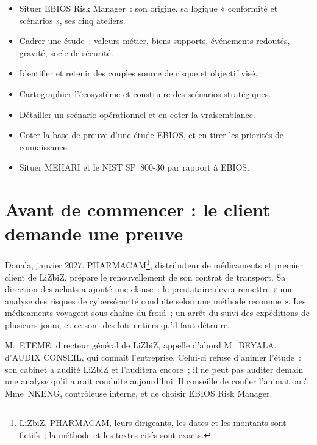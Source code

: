 \begin{boxobjectifs}
\begin{itemize}
    \item Situer EBIOS Risk Manager~: son origine, sa logique « conformité
          et scénarios », ses cinq ateliers.
    \item Cadrer une étude~: valeurs métier, biens supports, événements
          redoutés, gravité, socle de sécurité.
    \item Identifier et retenir des couples source de risque et objectif
          visé.
    \item Cartographier l'écosystème et construire des scénarios
          stratégiques.
    \item Détailler un scénario opérationnel et en coter la vraisemblance.
    \item Coter la base de preuve d'une étude EBIOS, et en tirer les
          priorités de connaissance.
    \item Situer MEHARI et le NIST SP~800-30 par rapport à EBIOS.
\end{itemize}
\end{boxobjectifs}

\bigskip

\section*{Avant de commencer : le client demande une preuve}

Douala, janvier 2027. PHARMACAM\footnote{LiZbiZ, PHARMACAM, leurs
dirigeants, les dates et les montants sont fictifs~; la méthode et les
textes cités sont exacts.}, distributeur de médicaments et premier client
de LiZbiZ, prépare le renouvellement de son contrat de transport. Sa
direction des achats a ajouté une clause~: le prestataire devra remettre
« une analyse des risques de cybersécurité conduite selon une méthode
reconnue ». Les médicaments voyagent sous chaîne du froid~; un arrêt du
suivi des expéditions de plusieurs jours, et ce sont des lots entiers
qu'il faut détruire.

M.~ETEME, directeur général de LiZbiZ, appelle d'abord M.~BEYALA, d'AUDIX
CONSEIL, qui connaît l'entreprise. Celui-ci refuse d'animer l'étude~: son
cabinet a audité LiZbiZ et l'auditera encore~; il ne peut pas auditer
demain une analyse qu'il aurait conduite aujourd'hui. Il conseille de
confier l'animation à Mme~NKENG, contrôleuse interne, et de choisir EBIOS
Risk Manager.

